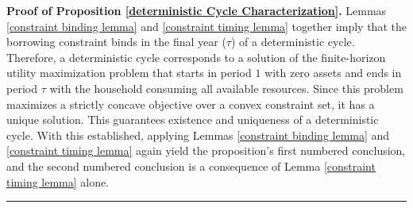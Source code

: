 \documentclass[fleqccn,12pt]{article}
\newenvironment{proof}[1][Proof]{\noindent\textbf{#1.} }{\ \rule{0.5em}{0.5em}}
\begin{document}
\begin{proof}[Proof of Proposition \ref{deterministic Cycle Characterization}]
Lemmas \ref{constraint binding lemma} and \ref{constraint timing lemma} together imply that the borrowing constraint binds in the final year ($\tau$) of a deterministic cycle. Therefore, a deterministic cycle corresponds to a solution of the finite-horizon utility maximization problem that starts in period $1$ with zero assets and ends in period $\tau$ with the household consuming all available resources. Since this problem maximizes a strictly concave objective over a convex constraint set, it has a unique solution. This guarantees existence and uniqueness of a deterministic cycle. With this established, applying Lemmas \ref{constraint binding lemma} and \ref{constraint timing lemma} again yield the proposition's first numbered conclusion, and the second numbered conclusion is a consequence of Lemma \ref{constraint timing lemma} alone.
\end{proof}
\end{document}
